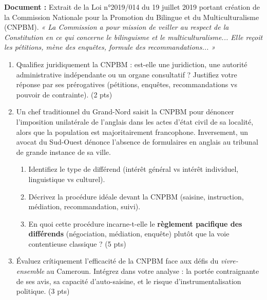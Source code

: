 \documentclass[11pt]{article}
\begin{document}
\begin{exercice}
\textbf{Document :} Extrait de la Loi n°2019/014 du 19 juillet 2019 portant création de la Commission Nationale pour la Promotion du Bilingue et du Multiculturalisme (CNPBM). \textit{« La Commission a pour mission de veiller au respect de la Constitution en ce qui concerne le bilinguisme et le multiculturalisme... Elle reçoit les pétitions, mène des enquêtes, formule des recommandations... »}

\begin{enumerate}
    \item Qualifiez juridiquement la CNPBM : est-elle une juridiction, une autorité administrative indépendante ou un organe consultatif ? Justifiez votre réponse par ses prérogatives (pétitions, enquêtes, recommandations vs pouvoir de contrainte). (2 pts)
    \item Un chef traditionnel du Grand-Nord saisit la CNPBM pour dénoncer l'imposition unilatérale de l'anglais dans les actes d'état civil de sa localité, alors que la population est majoritairement francophone. Inversement, un avocat du Sud-Ouest dénonce l'absence de formulaires en anglais au tribunal de grande instance de sa ville. 
    \begin{enumerate}
        \item Identifiez le type de différend (intérêt général vs intérêt individuel, linguistique vs culturel). 
        \item Décrivez la procédure idéale devant la CNPBM (saisine, instruction, médiation, recommandation, suivi). 
        \item En quoi cette procédure incarne-t-elle le \textbf{règlement pacifique des différends} (négociation, médiation, enquête) plutôt que la voie contentieuse classique ? (5 pts)
    \end{enumerate}
    \item Évaluez crítiquement l'efficacité de la CNPBM face aux défis du \textit{vivre-ensemble} au Cameroun. Intégrez dans votre analyse : la portée contraignante de ses avis, sa capacité d'auto-saisine, et le risque d'instrumentalisation politique. (3 pts)
\end{enumerate}
\end{exercice}
\end{document}
